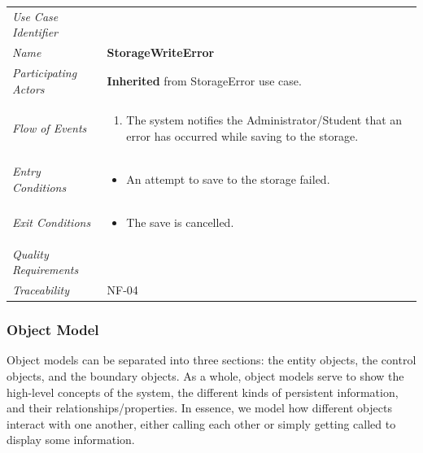 \documentclass[12pt,letterpaper]{article}
\begin{document}
\begin{center}
	\begin{tabu} to 
		\toprule
		Use Case Identifier &  \\
		Name & {\bf StorageWriteError} \\
		Participating Actors & \textbf{Inherited} from StorageError use case. \\
		Flow of Events & 
		\begin{minipage}[t]{\linewidth}
		    \begin{enumerate}
			    \item The system notifies the Administrator/Student that an error has occurred while saving to the storage.
			\end{enumerate}
		\end{minipage} \\

		Entry Conditions &
		\begin{minipage}[t]{\linewidth}
			\begin{itemize}
			    \item An attempt to save to the storage failed.
	        \end{itemize}
		\end{minipage} \\

		Exit Conditions &
		\begin{minipage}[t]{\linewidth}
			\begin{itemize}
			    \item The save is cancelled.
	        \end{itemize}
		\end{minipage} \\

		Quality Requirements & \\

		Traceability & NF-04 \\
		\toprule
	\end{tabu}
\end{center}

\subsubsection{Object Model}

Object models can be separated into three sections: the entity objects, the control objects, and the boundary objects. As a whole, object models serve to
show the high-level concepts of the system, the different kinds of persistent information, and their relationships/properties. In essence, we model how different
objects interact with one another, either calling each other or simply getting called to display some information.
\end{document}
